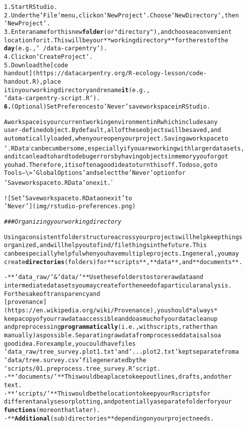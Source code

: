 \documentclass{article}\usepackage[]{graphicx}\usepackage[]{xcolor}
\makeatletter
\newcommand{\hlstr}[1]{\textcolor[rgb]{0.192,0.494,0.8}{#1}}%
\newcommand{\hlcom}[1]{\textcolor[rgb]{0.678,0.584,0.686}{\textit{#1}}}%
\newcommand{\hlkwd}[1]{\textcolor[rgb]{0.737,0.353,0.396}{\textbf{#1}}}%
\newenvironment{kframe}{%
 \def\at@end@of@kframe{}%
 \ifinner\ifhmode%
  \def\at@end@of@kframe{\end{minipage}}%
  \begin{minipage}{\columnwidth}%
 \fi\fi%
 \def\FrameCommand##1{\hskip\@totalleftmargin \hskip-\fboxsep
 \colorbox{shadecolor}{##1}\hskip-\fboxsep
     \hskip-\linewidth \hskip-\@totalleftmargin \hskip\columnwidth}%
 \MakeFramed {\advance\hsize-\width
   \@totalleftmargin\z@ \linewidth\hsize
   \@setminipage}}%
 {\par\unskip\endMakeFramed%
 \at@end@of@kframe}
\newenvironment{knitrout}{}{} %
\makeatother
\begin{document}
\begin{knitrout}
\begin{kframe}
\begin{alltt}
1.  Start RStudio.
2.  Under the `File` menu, click on `New Project`. Choose `New Directory`, then
    `New Project`.
3.  Enter a name for this new \hlkwd{folder} (or \hlstr{"directory"}), and choose a convenient
    location for it. This will be your **working directory** for the rest of the
    \hlkwd{day} (e.g., `~/data-carpentry`).
4.  Click on `Create Project`.
5.  Download the [code
    handout](https://datacarpentry.org/R-ecology-lesson/code-handout.R), place
    it in your working directory and rename \hlkwd{it} (e.g.,
    `data-carpentry-script.R`).
\hlkwd{6.}  (Optional) Set Preferences to \hlstr{'Never'} save workspace in RStudio.

A workspace is your current working environment in R which includes any
user-defined object. By default, all of these objects will be saved, and
automatically loaded, when you reopen your project. Saving a workspace to
`.RData` can be cumbersome, especially if you are working with larger datasets,
and it can lead to hard to debug errors by having objects in memory you forgot
you had. Therefore, it is often a good idea to turn this off. To do so, go to
Tools --\textbackslash{}> \hlstr{'Global Options'} and select the \hlstr{'Never'} option for
\hlstr{'Save workspace to .RData'} on exit.'

![Set \hlstr{'Save workspace to .RData on exit'} to
\hlstr{'Never'}](img/rstudio-preferences.png)

\hlcom{### Organizing your working directory}

Using a consistent folder structure across your projects will help keep things
organized, and will help you to find/file things in the future. This
can be especially helpful when you have multiple projects. In general, you may
create \hlkwd{directories} (folders) for **scripts**, **data**, and **documents**.

-   **`data_raw/` & `data/`** Use these folders to store raw data and
    intermediate datasets you may create for the need of a particular analysis.
    For the sake of transparency and
    [provenance](https://en.wikipedia.org/wiki/Provenance), you should *always*
    keep a copy of your raw data accessible and do as much of your data cleanup
    and preprocessing \hlkwd{programmatically} (i.e., with scripts, rather than
    manually) as possible. Separating raw data from processed data is also a
    good idea. For example, you could have files
    `data_raw/tree_survey.plot1.txt` and `...plot2.txt` kept separate from a
    `data/tree.survey.csv` file generated by the
    `scripts/01.preprocess.tree_survey.R` script.
-   **`documents/`** This would be a place to keep outlines, drafts, and other
    text.
-   **`scripts/`** This would be the location to keep your R scripts for
    different analyses or plotting, and potentially a separate folder for your
    \hlkwd{functions} (more on that later).
-   **\hlkwd{Additional} (sub)directories** depending on your project needs.


\end{alltt}
\end{kframe}
\end{knitrout}
\end{document}
